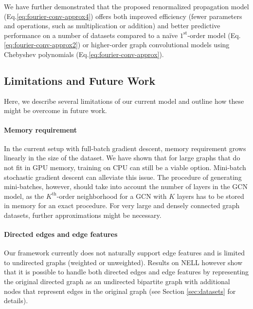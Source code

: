 \documentclass{article} %
\makeatletter
\newcommand*{\eq}{Eq.\@\xspace}
\makeatother
\begin{document}

We have further demonstrated that the proposed renormalized propagation model (\eq \ref{eq:fourier-conv-approx4}) offers both improved efficiency (fewer parameters and operations, such as multiplication or addition) and better predictive performance on a number of datasets compared to a na\"ive $1^{\text{st}}$-order model (\eq \ref{eq:fourier-conv-approx2}) or higher-order graph convolutional models using Chebyshev polynomials (\eq \ref{eq:fourier-conv-approx}).

\subsection{Limitations and Future Work}
Here, we describe several limitations of our current model and outline how these might be overcome in future work.

\paragraph{Memory requirement}
In the current setup with full-batch gradient descent, memory requirement grows linearly in the size of the dataset. We have shown that for large graphs that do not fit in GPU memory, training on CPU can still be a viable option. Mini-batch stochastic gradient descent can alleviate this issue. The procedure of generating mini-batches, however, should take into account the number of layers in the GCN model, as the $K^{\text{th}}$-order neighborhood for a GCN with $K$ layers has to be stored in memory for an exact procedure. For very large and densely connected graph datasets, further approximations might be necessary.

\paragraph{Directed edges and edge features}
Our framework currently does not naturally support edge features and is limited to undirected graphs (weighted or unweighted). Results on NELL however show that it is possible to handle both directed edges and edge features by representing the original directed graph as an undirected bipartite graph with additional nodes that represent edges in the original graph (see Section \ref{sec:datasets} for details).%
\end{document}
